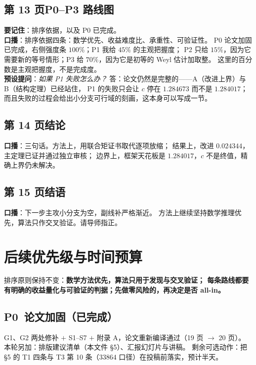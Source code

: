\documentclass[UTF8,11pt]{ctexart}
\begin{document}
\subsection*{第 13 页\quad P0--P3 路线图}
\textbf{要记住}：排序依据，以及 P0 已完成。\\
\textbf{口播}：排序依据四条：数学优先、收益难度比、承重性、可验证性。
P0 论文加固已完成，右侧强度条 $100\%$；P1 我给 $45\%$ 的主观把握度；
P2 只给 $15\%$，因为它需要新的等号情形；P3 给 $70\%$，因为它是初等的 Weyl 估计加取整。
这里的百分数是主观把握度，不是完成度。\\
\textbf{预设提问}：\emph{如果 P1 失败怎么办？}
答：论文仍然是完整的——A（改进上界）与 B（结构定理）已经站住，
P1 的失败只会让 $c$ 停在 $1.284673$ 而不是 $1.284017$；
而且失败的过程会给出小分支可行域的刻画，这本身可以写成一节。

\subsection*{第 14 页\quad 结论}
\textbf{口播}：三句话。方法上，用联合矩证书取代逐项放缩；
结果上，改进 $0.024344$，主定理已证并通过独立审核；
边界上，框架天花板是 $1.284017$，$c$ 不是终值，精确上界仍未解决。

\subsection*{第 15 页\quad 结语}
\textbf{口播}：下一步主攻小分支为空，副线补严格渐近。
方法上继续坚持数学推理优先，算法只作交叉验证。请导师指正。

\section{后续优先级与时间预算}

排序原则保持不变：\textbf{数学方法优先，算法只用于发现与交叉验证；
每条路线都要有明确的收益量化与可验证的判据；先做零风险的，再决定是否 all-in。}

\subsection*{P0\ 论文加固\quad（已完成）}
G1、G2 两处修补 $+$ S1--S7 $+$ 附录 A，论文重新编译通过（19 页 $\to$ 20 页）。
本轮另加：排版建议清单（本文件 \S5）、汇报幻灯片与讲稿。
剩余可选动作：把 \S5 的 T1 四条与 T3 第 10 条（$33864$ 口径）在投稿前落实，预计半天。
\end{document}
